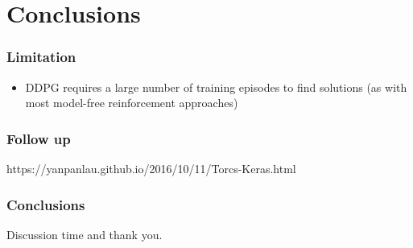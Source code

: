 \section{Conclusions}

\begin{frame}
\frametitle{Limitation}
\begin{itemize}
  \item DDPG requires a large number of training episodes to find solutions
  (as with most model-free reinforcement approaches)
\end{itemize}
\end{frame}

\begin{frame}
\frametitle{Follow up}
https://yanpanlau.github.io/2016/10/11/Torcs-Keras.html
\end{frame}

\begin{frame}
\frametitle{Conclusions}

\end{frame}

\begin{frame}
\Huge{\centerline{Discussion time and thank you.}}
\end{frame}
